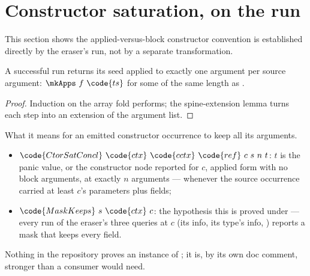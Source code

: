 \section{Constructor saturation, on the run}
\label{sec:coldstart:ctorsat}

This section shows the applied-versus-block constructor convention is established directly by the
eraser's run, not by a separate transformation.

\begin{lemma}
\label{lem:run_visitAppArgs_mkApps}
\leanok
{}
 A successful  run returns its seed applied to exactly one
\lbox{} argument per source argument: $\mkApps\ f\ \code{ts}$ for some  of the same length as
.
\end{lemma}
\begin{proof}
\leanok
{}
 Induction on the array fold  performs; the spine-extension lemma turns
each step into an extension of the argument list.
\end{proof}
\begin{definition}
\label{def:CtorSatConcl}
\leanok
{}
 What it means for an emitted constructor occurrence to keep all its arguments.
\begin{itemize}
\item $\code{CtorSatConcl}\ \code{ctx}\ \code{cctx}\ \code{ref}\ c\ s\ n\ t$: $t$ is the panic value, or
the constructor node reported for $c$, applied form with no block arguments, at exactly $n$ arguments
--- whenever the source occurrence carried at least $c$'s parameters plus fields;
\item $\code{MaskKeeps}\ s\ \code{ctx}\ c$: the hypothesis this is proved under --- every run of the
eraser's three queries at $c$ (its info, its type's info, ) reports a mask
that keeps every field.
\end{itemize}
\end{definition}
\begin{remark}
 Nothing in the repository proves an instance of ; it is, by its own doc
comment, stronger than a consumer would need.
\end{remark}
